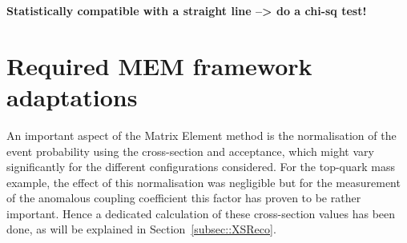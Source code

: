 \textbf{Statistically compatible with a straight line --> do a chi-sq test!}


\section{Required MEM framework adaptations} \label{sec::RecoAdapt}


An important aspect of the Matrix Element method is the normalisation of the event probability using the cross-section and acceptance, which might vary significantly for the different configurations considered. For the top-quark mass example, the effect of this normalisation was negligible but for the measurement of the anomalous coupling coefficient this factor has proven to be rather important. 
Hence a dedicated calculation of these cross-section values has been done, as will be explained in Section~\ref{subsec::XSReco}.
\\

